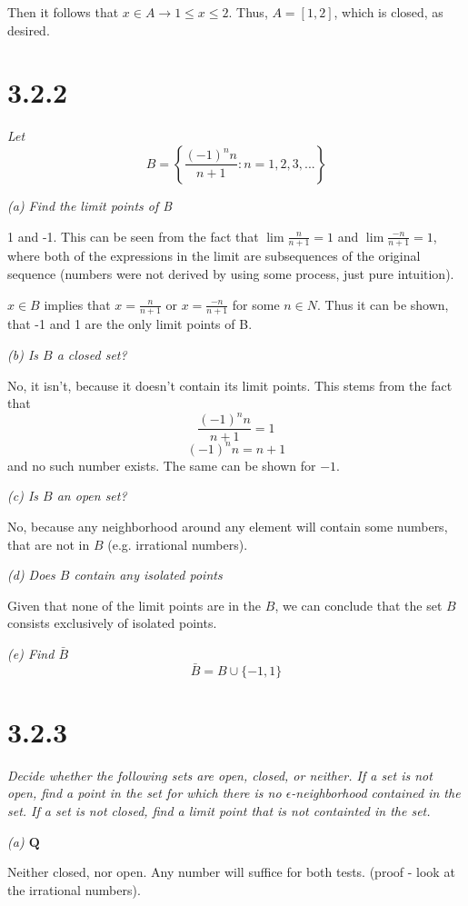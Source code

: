 \documentclass[11pt,oneside,titlepage]{book}
\begin{document}
Then it follows that $x \in A \to 1 \leq x \leq 2$. Thus, $A = [1,2]$, which is
closed, as desired.


\section*{3.2.2 }
\textit{Let }
$$B = \left\{\frac{(-1)^nn}{n + 1}: n = 1,2,3,... \right\}$$

\textit{(a) Find the limit points of B}

1 and -1. This can be seen from the fact that $\lim \frac{n}{n + 1} = 1$ and
$\lim \frac{-n}{n + 1} = 1$, where both of the expressions in the limit
are subsequences of the original sequence (numbers were not derived by using
some process, just pure intuition).

$x \in B$ implies that $x = \frac{n}{n + 1}$  or $x = \frac{-n}{n + 1}$ for
some $n \in N$. Thus it can be shown, that -1 and 1 are the only limit points
of B.

\textit{(b) Is $B$ a closed set?}

No, it isn't, because it doesn't contain its limit points. This stems from
the fact that
$$\frac{(-1)^nn}{n + 1} = 1$$
$$(-1)^nn = n + 1$$
and no such number exists. The same can be shown for $-1$.

\textit{(c) Is $B$ an open set?}

No, because any neighborhood around any element will contain some  numbers,
that are not in $B$ (e.g. irrational numbers).

\textit{(d) Does $B$ contain any isolated points}

Given that none of the limit points are in the $B$, we can conclude that
the set $B$ consists exclusively of isolated points.

\textit{(e) Find $\bar{B}$}
$$\bar{B} = B \cup \{-1, 1\}$$

\section*{3.2.3}
\textit{Decide whether the following sets are open, closed, or neither. If a
  set is not open, find a point in the set for which there is no
  $\epsilon$-neighborhood contained in the set. If a set is not closed, find
  a limit point that is not containted in the set.  }

\textit{(a) $\textbf{Q}$}

Neither closed, nor open. Any number will suffice for both tests.
(proof - look at the irrational numbers).
\end{document}
